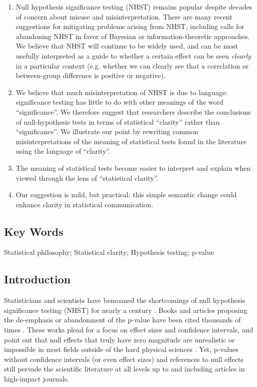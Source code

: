 \documentclass[12pt, english, dvipsnames, table]{article} %
\newcommand{\pval}{p-value\xspace}
\newcommand{\pvals}{p-values\xspace}
\begin{document}
\begin{enumerate}

\item Null hypothesis significance testing (NHST) remains popular despite decades of concern about misuse and misinterpretation. There are many recent suggestions for mitigating problems arising from NHST, including calls for abandoning NHST in favor of Bayesian or information-theoretic approaches. We believe that NHST will continue to be widely used, and can be most usefully interpreted as a guide to whether a certain effect can be seen \emph{clearly} in a particular context (e.g. whether we can clearly see that a correlation or between-group difference is positive or negative). 
\item We believe that much misinterpretation of NHST is due to language: significance testing has little to do with other meanings of the word ``significance''. We therefore suggest that researchers describe the conclusions of null-hypothesis tests in terms of statistical ``clarity'' rather than ``significance''. We illustrate our point by rewriting common misinterpretations of the meaning of statistical tests found in the literature using the language of ``clarity''.
\item The meaning of statistical tests become easier to interpret and explain when viewed through the lens of ``statistical clarity''.
\item Our suggestion is mild, but practical: this simple semantic change could enhance clarity in statistical communication.

\end{enumerate}

\subsection*{Key Words}

\noindent Statistical philosophy; Statistical clarity; Hypothesis testing; \pval

\clearpage
\doublespacing

\subsection*{Introduction}

\noindent Statisticians and scientists have bemoaned the shortcomings of null hypothesis significance testing (NHST) for nearly a century \citep{Cohen1994}. Books and articles proposing the de-emphasis or abandonment of the \pval have been cited thousands of times \citep{Cohen1994, Goodman1999, Wilkinson1999, ZiliakandMcCloskey2008, WassersteinandLazar2016}. These works plead for a focus on effect sizes and confidence intervals, and point out that null effects that truly have zero magnitude are unrealistic or impossible in most fields outside of the hard physical sciences \citep{Meehl1990, Tukey1991, Cohen1994}. Yet, \pvals without confidence intervals (or even effect sizes) and references to null effects still pervade the scientific literature at all levels up to and including articles in high-impact journals.
\end{document}
